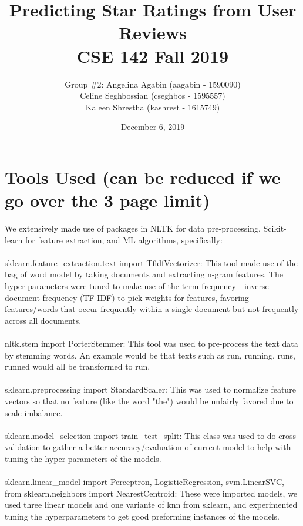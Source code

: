 \documentclass{article}
\title{Predicting Star Ratings from User Reviews\\CSE 142 Fall 2019}
\date{December 6, 2019}
\author{Group \#2: Angelina Agabin (aagabin - 1590090)  \\ Celine Seghbossian (cseghbos - 1595557) \\ Kaleen Shrestha (kashrest - 1615749)}
\begin{document}
\maketitle

\section{Tools Used (can be reduced if we go over the 3 page limit)}
We extensively made use of packages in NLTK for data pre-processing, Scikit-learn for feature extraction,  and ML algorithms, specifically:\\
\\sklearn.feature\_extraction.text import TfidfVectorizer: This tool made use of the bag of word model by taking documents and extracting n-gram features. The hyper parameters were tuned to make use of the term-frequency - inverse document frequency (TF-IDF) to pick weights for features, favoring features/words that occur frequently within a single document but not frequently across all documents.\\
\\nltk.stem import PorterStemmer: This tool was used to pre-process the text data by stemming words. An example would be that texts such as run, running, runs, runned would all be transformed to run.\\
\\sklearn.preprocessing import StandardScaler: This was used to normalize feature vectors so that no feature (like the word "the") would be unfairly favored due to scale imbalance.\\
\\sklearn.model\_selection import train\_test\_split: This class was used to do cross-validation to gather a better accuracy/evaluation of current model to help with tuning the hyper-parameters of the models.\\
\\sklearn.linear\_model import Perceptron, LogisticRegression, svm.LinearSVC, from sklearn.neighbors import NearestCentroid: These were imported models, we used three linear models and one variante of knn from sklearn, and experimented tuning the hyperparameters to get good preforming instances of the models.
\end{document}
